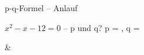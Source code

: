 \setcounter{aufgabe}{0}

\begin{aufgabe}{p-q-Formel – Anlauf}
\begin{teile}
\teil $x^2 - x - 12 = 0$ – p und q? p = \leerfeld , q = \leerfeld
\end{teile}
\begin{gleichungsraster}[2]
 &
 \\
\end{gleichungsraster}
\end{aufgabe}

